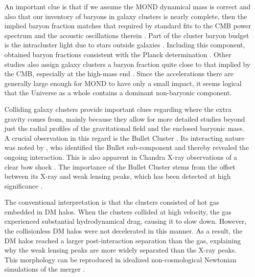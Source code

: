 \documentclass[fleqn,usenatbib,useAMS,onecolumn]{mnras} %
\begin{document}
An important clue is that if we assume the MOND dynamical mass is correct and also that our inventory of baryons in galaxy clusters is nearly complete, then the implied baryon fraction matches that required by standard fits to the CMB power spectrum and the acoustic oscillations therein \citep{Pointecouteau_2005}. Part of the cluster baryon budget is the intracluster light due to stars outside galaxies \citep{Gonzalez_2007}. Including this component, \citet{Gonzalez_2013} obtained baryon fractions consistent with the Planck determination \citep{Planck_2020}. Other studies also assign galaxy clusters a baryon fraction quite close to that implied by the CMB, especially at the high-mass end \citep{Cosmos_2009, McGaugh_2010}. Since the accelerations there are generally large enough for MOND to have only a small impact, it seems logical that the Universe as a whole contains a dominant non-baryonic component.

Colliding galaxy clusters provide important clues regarding where the extra gravity comes from, mainly because they allow for more detailed studies beyond just the radial profiles of the gravitational field and the enclosed baryonic mass. A crucial observation in this regard is the Bullet Cluster \citep[discovered by][]{Tucker_1995}. Its interacting nature was noted by \citet{Tucker_1998}, who identified the Bullet sub-component and thereby revealed the ongoing interaction. This is also apparent in Chandra X-ray observations of a clear bow shock \citep{Markevitch_2002}. The importance of the Bullet Cluster stems from the offset between its X-ray and weak lensing peaks, which has been detected at high significance \citep{Clowe_2004, Clowe_2006}.

The conventional interpretation is that the clusters consisted of hot gas embedded in DM halos. When the clusters collided at high velocity, the gas experienced substantial hydrodynamical drag, causing it to slow down. However, the collisionless DM halos were not decelerated in this manner. As a result, the DM halos reached a larger post-interaction separation than the gas, explaining why the weak lensing peaks are more widely separated than the X-ray peaks. This morphology can be reproduced in idealized non-cosmological Newtonian simulations of the merger \citep{Lage_Farrar_2014}.
\end{document}
